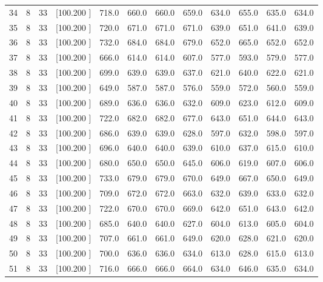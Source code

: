 \documentclass[12pt,a4paper]{article}
\begin{document}
\begin{center}
{\begin{tabular}{r r r r r r r r r r r r}
  34&  8& 33&[100.200   ]&   718.0&   660.0&   660.0&   659.0&   634.0&   655.0&   635.0&   634.0\\[-0.02in]
  35&  8& 33&[100.200   ]&   720.0&   671.0&   671.0&   671.0&   639.0&   651.0&   641.0&   639.0\\[-0.02in]
  36&  8& 33&[100.200   ]&   732.0&   684.0&   684.0&   679.0&   652.0&   665.0&   652.0&   652.0\\[-0.02in]
  37&  8& 33&[100.200   ]&   666.0&   614.0&   614.0&   607.0&   577.0&   593.0&   579.0&   577.0\\[-0.02in]
  38&  8& 33&[100.200   ]&   699.0&   639.0&   639.0&   637.0&   621.0&   640.0&   622.0&   621.0\\[-0.02in]
  39&  8& 33&[100.200   ]&   649.0&   587.0&   587.0&   576.0&   559.0&   572.0&   560.0&   559.0\\[-0.02in]
  40&  8& 33&[100.200   ]&   689.0&   636.0&   636.0&   632.0&   609.0&   623.0&   612.0&   609.0\\[-0.02in]
  41&  8& 33&[100.200   ]&   722.0&   682.0&   682.0&   677.0&   643.0&   651.0&   644.0&   643.0\\[-0.02in]
  42&  8& 33&[100.200   ]&   686.0&   639.0&   639.0&   628.0&   597.0&   632.0&   598.0&   597.0\\[-0.02in]
  43&  8& 33&[100.200   ]&   696.0&   640.0&   640.0&   639.0&   610.0&   637.0&   615.0&   610.0\\[-0.02in]
  44&  8& 33&[100.200   ]&   680.0&   650.0&   650.0&   645.0&   606.0&   619.0&   607.0&   606.0\\[-0.02in]
  45&  8& 33&[100.200   ]&   733.0&   679.0&   679.0&   670.0&   649.0&   667.0&   650.0&   649.0\\[-0.02in]
  46&  8& 33&[100.200   ]&   709.0&   672.0&   672.0&   663.0&   632.0&   639.0&   633.0&   632.0\\[-0.02in]
  47&  8& 33&[100.200   ]&   722.0&   670.0&   670.0&   669.0&   642.0&   651.0&   643.0&   642.0\\[-0.02in]
  48&  8& 33&[100.200   ]&   685.0&   640.0&   640.0&   627.0&   604.0&   613.0&   605.0&   604.0\\[-0.02in]
  49&  8& 33&[100.200   ]&   707.0&   661.0&   661.0&   649.0&   620.0&   628.0&   621.0&   620.0\\[-0.02in]
  50&  8& 33&[100.200   ]&   700.0&   636.0&   636.0&   634.0&   613.0&   628.0&   615.0&   613.0\\[-0.02in]
  51&  8& 33&[100.200   ]&   716.0&   666.0&   666.0&   664.0&   634.0&   646.0&   635.0&   634.0\\[-0.02in]

\end{tabular}}
\end{center}
\end{document}
